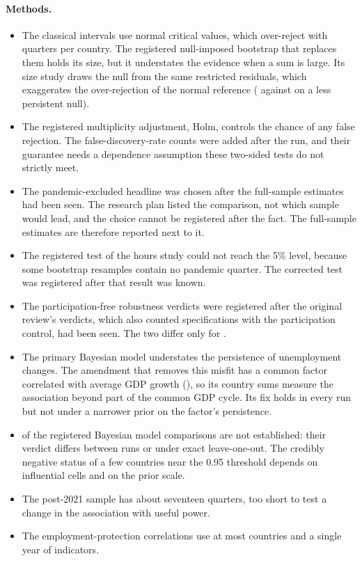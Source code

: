 \paragraph{Methods.}
\begin{itemize}
  \item The classical intervals use normal critical values, which over-reject
    with  quarters per country. The registered null-imposed bootstrap
    that replaces them holds its size, but it understates the evidence when a sum is
    large. Its size study draws the null from the same restricted residuals, which
    exaggerates the over-rejection of the normal reference ( against
     on a less persistent null).
  \item The registered multiplicity adjustment, Holm, controls the chance of any false
    rejection. The false-discovery-rate counts were added after the run, and their
    guarantee needs a dependence assumption these two-sided tests do not strictly meet.
  \item The pandemic-excluded headline was chosen after the full-sample estimates had
    been seen. The research plan listed the comparison, not which sample would lead, and
    the choice cannot be registered after the fact. The full-sample estimates are
    therefore reported next to it.
  \item The registered test of the hours study could not reach the 5\% level, because
    some bootstrap resamples contain no pandemic quarter. The corrected test was registered
    after that result was known.
  \item The participation-free robustness verdicts were registered after the original
    review's verdicts, which also counted specifications with the participation control,
    had been seen. The two differ only for .
  \item The primary Bayesian model understates the persistence of unemployment changes.
    The amendment that removes this misfit has a common factor correlated with average
    GDP growth (), so its country sums measure the association beyond
    part of the common GDP cycle. Its fix holds in every run but not under a narrower
    prior on the factor's persistence.
  \item {} of the  registered Bayesian model comparisons
    are not established: their verdict differs between runs or under exact
    leave-one-out. The credibly negative status of a few countries near the 0.95
    threshold depends on influential cells and on the prior scale.
  \item The post-2021 sample has about seventeen quarters, too short to test a change in
    the association with useful power.
  \item The employment-protection correlations use at most  countries
    and a single year of indicators.
\end{itemize}

